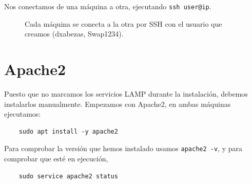 \documentclass{article}
\begin{document}
Nos conectamos de una máquina a otra, ejecutando \texttt{ssh user@ip}.
\begin{figure}[H]
\centering
{}
\caption{Cada máquina se conecta a la otra por SSH con el usuario que creamos (dxabezas, Swap1234).}
\label{fig:ssh}
\end{figure}

\section{Apache2}

Puesto que no marcamos los servicios LAMP durante la instalación, debemos instalarlos manualmente. Empezamos con Apache2, en ambas máquinas ejecutamos:
\begin{verbatim}
	sudo apt install -y apache2
\end{verbatim}

Para comprobar la versión que hemos instalado usamos \texttt{apache2 -v}, y para comprobar que esté en ejecución, 
\begin{verbatim}
	sudo service apache2 status
\end{verbatim}
\end{document}
